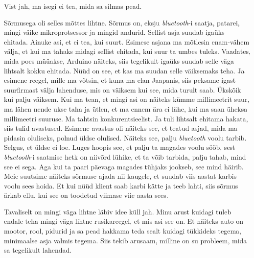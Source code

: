 Vist jah, ma isegi ei tea, mida sa silmas pead. 


Sõrmusega oli selles mõttes lihtne. Sõrmus on, eksju \emph{bluetooth}-i saatja, patarei, mingi väike mikroprotsessor ja mingid andurid. Sellist asja suudab igaüks ehitada. Ainuke asi, et ei tea, kui suurt. Esimese asjana ma mõtlesin enam-vähem välja, et kui ma tahaks midagi sellist ehitada, kui suur ta umbes tuleks. Vaadates, mida poes müüakse, Arduino näiteks, siis tegelikult igaüks suudab selle väga lihtsalt kokku ehitada. Nüüd on see, et kas ma suudan selle väiksemaks teha. Ja esimene reegel, mille ma võtsin, et kuna ma elan Jaapanis, siis peksame igast suurfirmast välja lahenduse, mis on väiksem kui see, mida turult saab. Ükskõik kui palju väiksem. Kui ma tean, et mingi asi on näiteks kümme millimeetrit suur, ma lähen nende ukse taha ja ütlen, et ma ennem ära ei lähe, kui ma saan üheksa millimeetri suuruse. Ma tahtsin konkurentsieelist. Ja tuli lihtsalt ehitama hakata, siis tulid avastused. Esimene avastus oli näiteks see, et teatud asjad, mida ma pidasin oluliseks, polnud üldse olulised. Näiteks see, palju \emph{bluetooth} voolu tarbib. Selgus, et üldse ei loe. Luges hoopis see, et palju ta magades voolu sööb, sest \emph{bluetooth}-i saatmise hetk on niivõrd lühike, et ta võib tarbida, palju tahab, mind see ei sega. Aga kui ta paari päevaga magades tühjaks jookseb, see mind häirib. Meie suutsime näiteks sõrmuse ajada nii kaugele, et suudab viis aastat karbis voolu sees hoida. Et kui nüüd klient saab karbi kätte ja teeb lahti, siis sõrmus ärkab ellu,  kui see on toodetud viimase viie aasta sees. 


Tavaliselt on mingi väga lihtne läbiv idee küll jah. Minu arust kuidagi tuleb endale teha mingi väga lihtne rusikareegel, et mis asi see on. Et näiteks auto on mootor, rool, pidurid ja  sa pead hakkama teda sealt kuidagi tükkideks tegema, minimaalse asja valmis tegema. Siis tekib arusaam, milline on su probleem, mida sa tegelikult lahendad. 


